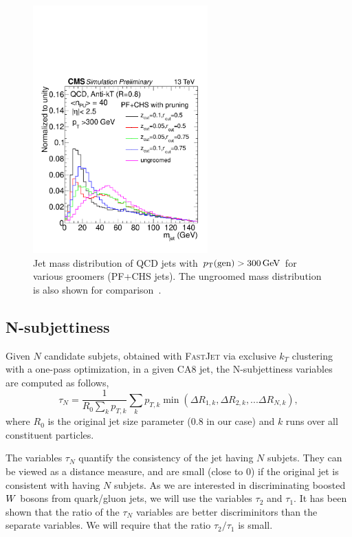 \begin{figure}
  \centering
  \includegraphics[width=0.6\textwidth]{figures/razor_wtag/1DPFCHS_PR_QCD}
  \caption{Jet mass distribution of QCD jets with $p_{\mathrm{T}}(\textrm{gen}) > 300 \,\text{Ge\hspace{-.08em}V}$ for various
groomers (PF+CHS jets). The ungroomed mass distribution is also shown for
comparison~\cite{CMS-PAS-JME-14-001}. 
  \label{fig:wtag_jet_pruning}}
\end{figure}


\subsection{N-subjettiness}

Given $N$ candidate subjets, obtained with \textsc{FastJet} via exclusive $k_T$ clustering with a
one-pass optimization, in a given CA8 jet, the N-subjettiness variables~\cite{Thaler:2010tr} are
computed as follows, 
\begin{equation}
\tau_N = \frac{1}{R_0 \sum_{k} p_{T, k}} \sum_k p_{T, k} \min (\Delta R_{1,k}, \Delta R_{2,k}, ...
\Delta R_{N,k}),
\end{equation}
where $R_0$ is the original jet size parameter (0.8 in our case) and $k$ runs over all constituent
particles. 

The variables $\tau_N$ quantify the consistency of the jet having $N$ subjets. They can be viewed
as a distance measure, and are small (close to 0) if the original jet is consistent with having $N$
subjets. As we are interested in discriminating boosted $W$ bosons from quark/gluon jets, we will
use the variables $\tau_2$ and $\tau_1$. 
It has been shown that the ratio of the $\tau_N$ variables are better discriminitors than the
separate variables. We will require that the ratio $\tau_2 / \tau_1$ is small.


